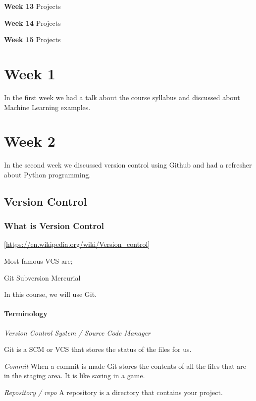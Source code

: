 \documentclass[
]{book}
\begin{document}
\textbf{Week 13} Projects

\textbf{Week 14} Projects

\textbf{Week 15} Projects

\hypertarget{week-1}{%
\chapter{Week 1}\label{week-1}}

In the first week we had a talk about the course syllabus and discussed about Machine Learning examples.

\hypertarget{week-2}{%
\chapter{Week 2}\label{week-2}}

In the second week we discussed version control using Github and had a refresher about Python programming.

\hypertarget{version-control}{%
\section{Version Control}\label{version-control}}

\hypertarget{what-is-version-control}{%
\subsection{What is Version Control}\label{what-is-version-control}}

{[}\url{https://en.wikipedia.org/wiki/Version_control}{]}

Most famous VCS are;

Git
Subversion
Mercurial

In this course, we will use Git.

\hypertarget{terminology}{%
\subsubsection{Terminology}\label{terminology}}

\emph{Version Control System / Source Code Manager}

Git is a SCM or VCS that stores the status of the files for us.

\emph{Commit}
When a commit is made Git stores the contents of all the files that are in the staging area. It is like saving in a game.

\emph{Repository / repo}
A repository is a directory that contains your project.
\end{document}
